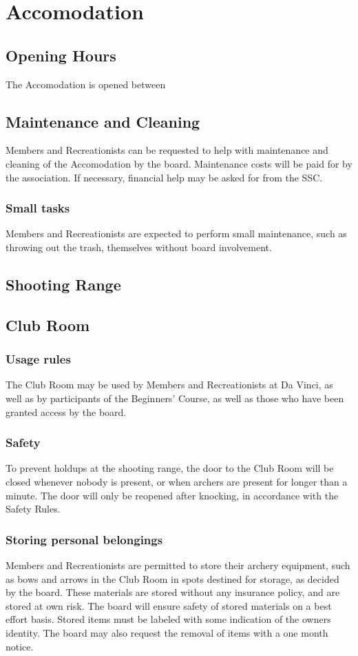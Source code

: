 \documentclass[a4paper]{article}
\newcommand{\Asr}{Safety Rules} %
\begin{document}
\section{Accomodation}
\subsection{Opening Hours}
The Accomodation is opened between

\subsection{Maintenance and Cleaning}
Members and Recreationists can be requested to help with maintenance and cleaning of the Accomodation by the board. Maintenance costs will be paid for by the association. If necessary, financial help may be asked for from the SSC.

\subsubsection{Small tasks}
Members and Recreationists are expected to perform small maintenance, such as throwing out the trash, themselves without board involvement.

\subsection{Shooting Range}


\subsection{Club Room}
\subsubsection{Usage rules}
The Club Room may be used by Members and Recreationists at Da Vinci, as well as by participants of the Beginners' Course, as well as those who have been granted access by the board. 

\subsubsection{Safety}
To prevent holdups at the shooting range, the door to the Club Room will be closed whenever nobody is present, or when archers are present for longer than a minute. The door will only be reopened after knocking, in accordance with the \Asr .

\subsubsection{Storing personal belongings}
Members and Recreationists are permitted to store their archery equipment, such as bows and arrows in the Club Room in spots destined for storage, as decided by the board. These materials are stored without any insurance policy, and are stored at own risk. The board will ensure safety of stored materials on a best effort basis. Stored items must be labeled with some indication of the owners identity. The board may also request the removal of items with a one month notice.
\end{document}
